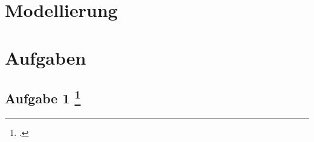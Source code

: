 \documentclass{lehramt-informatik-haupt}
\begin{document}

\chapter{Modellierung}


\chapter{Aufgaben}

\section{Aufgabe 1
\footcite{sosy:ab:3}}
\end{document}
